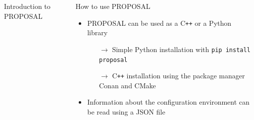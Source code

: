 \documentclass[t]{beamer}
\newlength{\itemseparation}
\begin{document}
\begin{columns}[onlytextwidth]
\begin{column}{0.45\textwidth}
\begin{block}[equal height group=F]{Introduction to PROPOSAL}
      \end{block}%
    \end{column}%

    \begin{column}{0.55\textwidth}%
      \begin{block}[equal height group=F]{How to use PROPOSAL}%
        \begin{itemize}
          \setlength\itemsep{\itemseparation}
          \item PROPOSAL can be used as a C\texttt{++} or a Python library
            \begin{itemize}
              \setlength\itemsep{\itemseparation}
              \item[$\rightarrow$] Simple Python installation with \colorbox{tuYellow}{\texttt{pip install proposal}}
              \item[$\rightarrow$] C\texttt{++} installation using the package manager Conan and CMake
            \end{itemize}
          \item Information about the configuration environment can be read using a JSON file
        \end{itemize}
        \vspace{-0.75em}
        \begin{columns}[onlytextwidth]
        \begin{column}{0.48\textwidth}
        \begin{mdframed}[backgroundcolor=light-gray, roundcorner=10pt,leftmargin=1, rightmargin=1, innerleftmargin=15, innertopmargin=15,innerbottommargin=15, outerlinewidth=1, linecolor=light-gray]

          
          \end{mdframed} 


\end{column}
\end{columns}
\end{block}
\end{column}
\end{columns}
\end{document}
